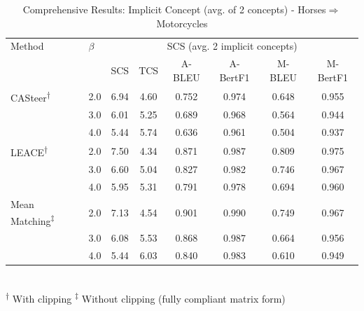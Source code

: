\begin{table}[htbp]
\centering
\caption{Comprehensive Results: Implicit Concept (avg. of 2 concepts) - Horses$\Rightarrow$Motorcycles}
\label{tab:implicitconcept_knight_s_riding_mammal_horsestomotorcycles_avg2}
\begin{tabular}{l|l|cccccc|}
\hline
Method & $\beta$ & \multicolumn{6}{c|}{SCS (avg. 2 implicit concepts)} \\
 &  & SCS & TCS & A-BLEU & A-BertF1 & M-BLEU & M-BertF1 \\
\hline
CASteer\textsuperscript{†} & 2.0 & 6.94 & 4.60 & 0.752 & 0.974 & 0.648 & 0.955 \\
 & 3.0 & 6.01 & 5.25 & 0.689 & 0.968 & 0.564 & 0.944 \\
 & 4.0 & 5.44 & 5.74 & 0.636 & 0.961 & 0.504 & 0.937 \\
\hline
LEACE\textsuperscript{†} & 2.0 & 7.50 & 4.34 & 0.871 & 0.987 & 0.809 & 0.975 \\
 & 3.0 & 6.60 & 5.04 & 0.827 & 0.982 & 0.746 & 0.967 \\
 & 4.0 & 5.95 & 5.31 & 0.791 & 0.978 & 0.694 & 0.960 \\
\hline
Mean Matching\textsuperscript{‡} & 2.0 & 7.13 & 4.54 & 0.901 & 0.990 & 0.749 & 0.967 \\
 & 3.0 & 6.08 & 5.53 & 0.868 & 0.987 & 0.664 & 0.956 \\
 & 4.0 & 5.44 & 6.03 & 0.840 & 0.983 & 0.610 & 0.949 \\
\hline
\end{tabular}
\\[0.5em]
\footnotesize
\textsuperscript{†} With clipping \quad \textsuperscript{‡} Without clipping (fully compliant matrix form)
\end{table}